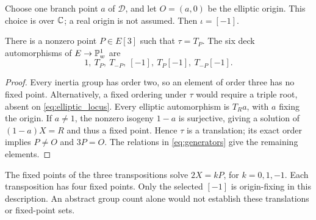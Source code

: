 Choose one branch point \(a\) of \(\mathcal D\), and let \(O=(a,0)\) be the elliptic origin. This choice is over \(\mathbb C\); a real origin is not assumed. Then \(\iota=[-1]\).

\begin{proposition}\label{prop:torsion_action}
There is a nonzero point \(P\in E[3]\) such that \(\tau=T_P\). The six deck automorphisms of \(E\to\mathbb P^1_w\) are
\begin{equation}\label{eq:six_autos}
 1,\ T_P,\ T_{-P},\ [-1],\ T_P[-1],\ T_{-P}[-1].
\end{equation}
\end{proposition}
\begin{proof}
Every inertia group has order two, so an element of order three has no fixed point. Alternatively, a fixed ordering under \(\tau\) would require a triple root, absent on \eqref{eq:elliptic_locus}. Every elliptic automorphism is \(T_R a\), with \(a\) fixing the origin. If \(a\ne1\), the nonzero isogeny \(1-a\) is surjective, giving a solution of \((1-a)X=R\) and thus a fixed point. Hence \(\tau\) is a translation; its exact order implies \(P\ne O\) and \(3P=O\). The relations in \eqref{eq:generators} give the remaining elements.
\end{proof}
The fixed points of the three transpositions solve \(2X=kP\), for \(k=0,1,-1\). Each transposition has four fixed points. Only the selected \([-1]\) is origin-fixing in this description. An abstract group count alone would not establish these translations or fixed-point sets.

